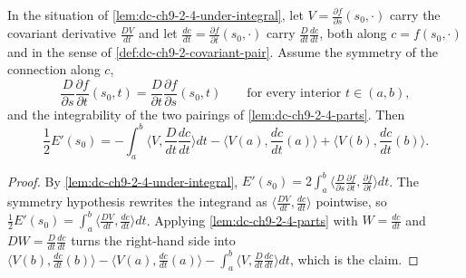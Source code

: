 \begin{lemma}
  \label{lem:dc-ch9-2-4-segment}


  In the situation of \cref{lem:dc-ch9-2-4-under-integral}, let $V=\frac{\partial f}{\partial s}(s_0,\cdot)$
  carry the covariant derivative $\frac{DV}{dt}$ and let $\frac{dc}{dt}=\frac{\partial f}{\partial t}(s_0,\cdot)$
  carry $\frac{D}{dt}\frac{dc}{dt}$, both along $c=f(s_0,\cdot)$ and in the sense of
  \cref{def:dc-ch9-2-covariant-pair}. Assume the symmetry of the connection along $c$,
  $$
  \frac{D}{\partial s}\frac{\partial f}{\partial t}(s_0,t)=\frac{D}{\partial t}\frac{\partial f}{\partial s}(s_0,t)
  \qquad\text{for every interior }t\in(a,b),
  $$
  and the integrability of the two pairings of \cref{lem:dc-ch9-2-4-parts}. Then
  $$
  \frac{1}{2}E'(s_0)
    = -\int_a^b\Big\langle V,\frac{D}{dt}\frac{dc}{dt}\Big\rangle dt
      -\Big\langle V(a),\frac{dc}{dt}(a)\Big\rangle
      +\Big\langle V(b),\frac{dc}{dt}(b)\Big\rangle .
  $$

\end{lemma}
\begin{proof}

  \sketch
  By \cref{lem:dc-ch9-2-4-under-integral},
  $E'(s_0)=2\int_a^b\langle\frac{D}{\partial s}\frac{\partial f}{\partial t},\frac{\partial f}{\partial t}\rangle dt$.
  The symmetry hypothesis rewrites the integrand as
  $\langle\frac{DV}{dt},\frac{dc}{dt}\rangle$ pointwise, so
  $\frac{1}{2}E'(s_0)=\int_a^b\langle\frac{DV}{dt},\frac{dc}{dt}\rangle dt$. Applying
  \cref{lem:dc-ch9-2-4-parts} with $W=\frac{dc}{dt}$ and $DW=\frac{D}{dt}\frac{dc}{dt}$
  turns the right-hand side into
  $\langle V(b),\frac{dc}{dt}(b)\rangle-\langle V(a),\frac{dc}{dt}(a)\rangle
  -\int_a^b\langle V,\frac{D}{dt}\frac{dc}{dt}\rangle dt$, which is the claim.
\end{proof}
